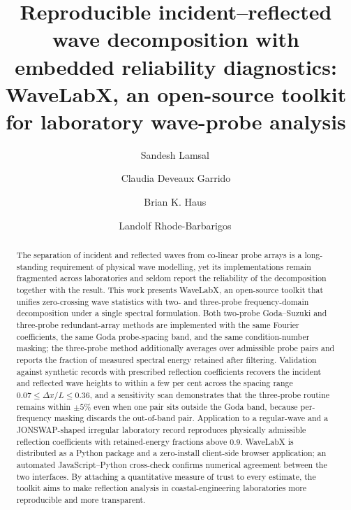 \documentclass[preprint,12pt,a4paper]{elsarticle}
\begin{document}
\begin{frontmatter}

\title{Reproducible incident--reflected wave decomposition with
embedded reliability diagnostics: WaveLabX, an open-source toolkit for
laboratory wave-probe analysis}

\author[a]{Sandesh Lamsal\,}

\author[a]{Claudia Deveaux Garrido}

\author[b]{Brian K. Haus\,}

\author[a]{Landolf Rhode-Barbarigos\,}

\address[a]{Department of Civil and Architectural Engineering,
University of Miami, Coral Gables, FL 33146, USA}
\address[b]{Department of Ocean Sciences, Rosenstiel School of Marine,
Atmospheric, and Earth Science, University of Miami, Miami, FL, USA}


\begin{abstract}
The separation of incident and reflected waves from co-linear probe
arrays is a long-standing requirement of physical wave modelling, yet
its implementations remain fragmented across laboratories and seldom
report the reliability of the decomposition together with the result.
This work presents WaveLabX, an open-source toolkit that unifies
zero-crossing wave statistics with two- and three-probe
frequency-domain decomposition under a single spectral formulation.
Both two-probe Goda--Suzuki and three-probe redundant-array methods are
implemented with the same Fourier coefficients, the same Goda
probe-spacing band, and the same condition-number masking; the
three-probe method additionally averages over admissible probe pairs
and reports the fraction of measured spectral energy retained after
filtering. Validation against synthetic records with prescribed
reflection coefficients recovers the incident and reflected wave
heights to within a few per cent across the spacing range
$0.07 \le \Delta x/L \le 0.36$, and a sensitivity scan demonstrates
that the three-probe routine remains within $\pm 5\%$ even when one
pair sits outside the Goda band, because per-frequency masking discards
the out-of-band pair. Application to a regular-wave and a
JONSWAP-shaped irregular laboratory record reproduces physically
admissible reflection coefficients with retained-energy fractions
above 0.9. WaveLabX is distributed as a Python package and a
zero-install client-side browser application; an automated
JavaScript--Python cross-check confirms numerical agreement between
the two interfaces. By attaching a quantitative measure of trust to
every estimate, the toolkit aims to make reflection analysis in
coastal-engineering laboratories more reproducible and more
transparent.
\end{abstract}


\end{frontmatter}
\end{document}
